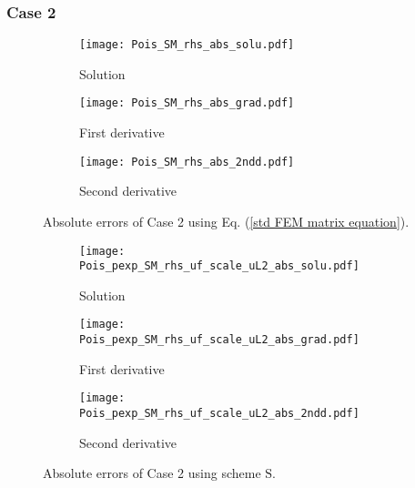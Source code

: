 \documentclass[final,3p]{elsarticle}
\begin{document}
\subsubsection{Case 2}
\begin{figure}[!ht]
    \begin{subfigure}{5.5cm}
        \texttt{[image: Pois\_SM\_rhs\_abs\_solu.pdf]}
        \caption{Solution}
        \label{Fig:Pois_SM_rhs_abs_solu}
    \end{subfigure}
    \begin{subfigure}{5.5cm}
        \texttt{[image: Pois\_SM\_rhs\_abs\_grad.pdf]}
        \caption{First derivative}
        \label{Fig:Pois_SM_rhs_abs_grad}
    \end{subfigure}
    \begin{subfigure}{5.5cm}
        \texttt{[image: Pois\_SM\_rhs\_abs\_2ndd.pdf]}
        \caption{Second derivative}
        \label{Fig:Pois_SM_rhs_abs_2ndd}
    \end{subfigure}
\caption{Absolute errors of Case 2 using Eq. (\ref{std FEM matrix equation}).}
\label{Pois_SM_rhs_abs}
\end{figure}

\begin{figure}[!ht]
    \begin{subfigure}{5.5cm}
        \texttt{[image: Pois\_pexp\_SM\_rhs\_uf\_scale\_uL2\_abs\_solu.pdf]}
        \caption{Solution}
        \label{Fig:Pois_pexp_SM_rhs_uf_scale_uL2_abs_solu}
    \end{subfigure}
    \begin{subfigure}{5.5cm}
        \texttt{[image: Pois\_pexp\_SM\_rhs\_uf\_scale\_uL2\_abs\_grad.pdf]}
        \caption{First derivative}
        \label{Fig:Pois_pexp_SM_rhs_uf_scale_uL2_abs_grad}
    \end{subfigure}
    \begin{subfigure}{5.5cm}
        \texttt{[image: Pois\_pexp\_SM\_rhs\_uf\_scale\_uL2\_abs\_2ndd.pdf]}
        \caption{Second derivative}
        \label{Fig:Pois_pexp_SM_rhs_uf_scale_uL2_abs_2ndd}
    \end{subfigure}
\caption{Absolute errors of Case 2 using scheme $\text{S}$.}
\label{Pois_pexp_SM_rhs_uf_scale_uL2_abs}
\end{figure}
\end{document}
